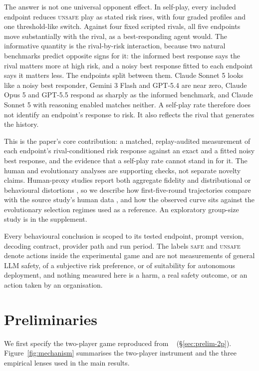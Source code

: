 \documentclass{article}
\newcommand{\Safe}{\textsc{safe}}
\newcommand{\Unsafe}{\textsc{unsafe}}
\DeclareRobustCommand{\citep}[1]{\cite{#1}}
\DeclareRobustCommand{\citet}[1]{\citeauthor{#1}~\shortcite{#1}}
\begin{document}
The answer is not one universal opponent effect. In self-play, every included
endpoint reduces \Unsafe{} play as stated risk rises, with four graded profiles
and one threshold-like switch. Against four fixed scripted rivals, all five
endpoints move substantially with the rival, as a best-responding agent would.
The informative quantity is the rival-by-risk interaction, because two natural
benchmarks predict opposite signs for it: the informed best response says the
rival matters more at high risk, and a noisy best response fitted to each
endpoint says it matters less. The endpoints split between them. Claude Sonnet
5 looks like a noisy best responder, Gemini 3 Flash and GPT-5.4 are near zero,
Claude Opus 5 and GPT-5.5
respond as sharply as the informed benchmark, and Claude Sonnet 5 with reasoning
enabled matches neither. A self-play rate therefore does not identify an
endpoint's response to risk. It also reflects the rival that generates the
history.

This is the paper's core contribution: a matched, replay-audited measurement of
each endpoint's rival-conditioned risk response against an exact and a fitted
noisy best response, and the evidence that a self-play rate cannot stand in for
it. The human and evolutionary
analyses are supporting checks, not separate novelty claims. Human-proxy studies
report both aggregate fidelity and distributional or behavioural distortions
\citep{using_llm_to_simulate,out_of_one,synthetic_replacement_human}, so we
describe how first-five-round trajectories compare with the source study's
human data \citep{falling_behind_unsafe}, and how the observed curve sits
against the evolutionary selection regimes used as a reference. An exploratory
group-size study is in the supplement.

Every behavioural conclusion is scoped to its tested endpoint, prompt version,
decoding contract, provider path and run period. The labels \Safe{} and
\Unsafe{} denote actions inside the experimental game and are not measurements
of general LLM safety, of a subjective risk preference, or of suitability for
autonomous deployment, and nothing measured here is a harm, a real safety
outcome, or an action taken by an organisation.

\section{Preliminaries}
\label{sec:preliminaries}

We first specify the two-player game reproduced from \citet{falling_behind_unsafe} (\S\ref{sec:prelim-2p}). Figure~\ref{fig:mechanism} summarises the two-player instrument and the three empirical lenses used in the main results.
\end{document}
